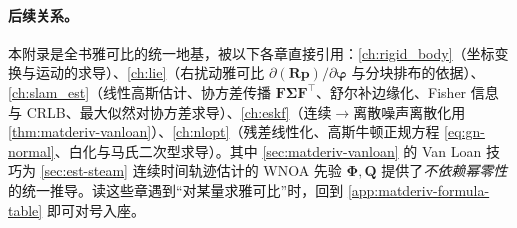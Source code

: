 \paragraph{后续关系。}
本附录是全书雅可比的统一地基，被以下各章直接引用：\cref{ch:rigid_body}（坐标变换与运动的求导）、\cref{ch:lie}（右扰动雅可比 $\partial(\mathbf{R}\mathbf{p})/\partial\boldsymbol{\varphi}$ 与分块排布的依据）、\cref{ch:slam_est}（线性高斯估计、协方差传播 $\mathbf{F}\boldsymbol{\Sigma}\mathbf{F}^\top$、舒尔补边缘化、Fisher 信息与 CRLB、最大似然对协方差求导）、\cref{ch:eskf}（连续$\to$离散噪声离散化用 \cref{thm:matderiv-vanloan}）、\cref{ch:nlopt}（残差线性化、高斯牛顿正规方程 \cref{eq:gn-normal}、白化与马氏二次型求导）。其中 \cref{sec:matderiv-vanloan} 的 Van Loan 技巧为 \cref{sec:est-steam} 连续时间轨迹估计的 WNOA 先验 $\boldsymbol{\Phi},\mathbf{Q}$ 提供了\emph{不依赖幂零性}的统一推导。读这些章遇到“对某量求雅可比”时，回到 \cref{app:matderiv-formula-table} 即可对号入座。


